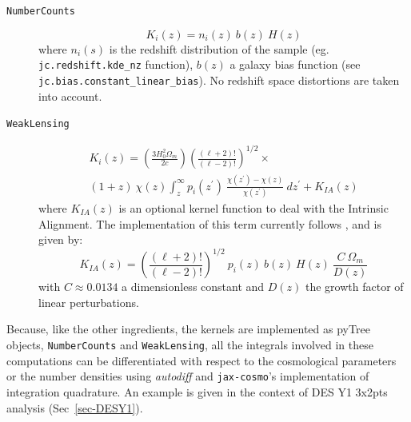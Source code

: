\documentclass[twocolumn,twocolappendix,nofootinbib,iop]{openjournal}
\newcommand{\FrL}[1]{{\color{cyan}FL: #1}}
\newcommand{\jaxcosmo}{\texttt{jax-cosmo}}
\begin{document}
\begin{description}
\item[\texttt{NumberCounts}]
    \begin{equation}
        K_i(z) = n_i(z)\ b(z)\ H(z)
    \end{equation}
where $n_i(s)$ is the redshift distribution of the sample (eg. \texttt{jc.redshift.kde\_nz} function), $b(z)$ a galaxy bias function (see  \texttt{jc.bias.constant\_linear\_bias}). No redshift space distortions are taken into account.

\item [\texttt{WeakLensing}]
    \begin{multline}
 K_i(z) = \left( \frac{3 H_0^2\Omega_m}{2 c} \right) \left(\frac{(\ell+2)!}{(\ell-2)!} \right)^{1/2}\times 
 \\  (1+z)\ \chi(z) \int_z^\infty p_i(z^\prime)\ \frac{\chi(z^\prime)-\chi(z)}{\chi(z^\prime)}\ dz^\prime + K_{IA}(z)
    \end{multline}
where $K_{IA}(z)$ is an optional kernel function to deal with the Intrinsic Alignment. The implementation of this term currently follows \citet{2011A&A...527A..26J}, and is given by:
\begin{equation}
    K_{IA}(z) =   \left(\frac{(\ell+2)!}{(\ell-2)!}\right)^{1/2}\ p_i(z)\ b(z)\  H(z)\ \frac{C\  \Omega_m}{D(z)}
\end{equation}
with $C\approx 0.0134$ a dimensionless constant and $D(z)$ the growth factor of linear perturbations.
\end{description}



Because, like the other ingredients, the kernels are implemented as pyTree objects, \texttt{NumberCounts} and \texttt{WeakLensing}, all the integrals involved in these computations can be  differentiated with respect to the cosmological parameters  or the number densities using \textit{autodiff} and \jaxcosmo's implementation of integration quadrature. An example is given in the context of DES Y1 3x2pts analysis (Sec~\ref{sec-DESY1}).
%
\end{document}

